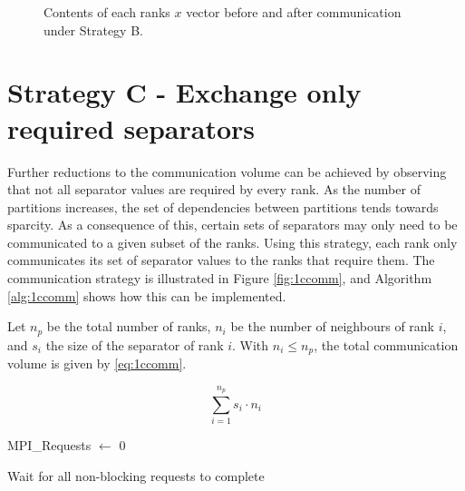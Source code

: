 \begin{figure}[H]
    \centering
    \caption{Contents of each ranks \(x\) vector before and after communication under Strategy B.}
    \label{fig:1bcomm}
\end{figure}

\section{Strategy C - Exchange only required separators}
Further reductions to the communication volume can be achieved by observing that not all separator values are required by every rank. As the number of partitions increases, the set of dependencies between partitions tends towards sparcity. As a consequence of this, certain sets of separators may only need to be communicated to a given subset of the ranks. Using this strategy, each rank only communicates its set of separator values to the ranks that require them. The communication strategy is illustrated in Figure \ref{fig:1ccomm}, and Algorithm \ref{alg:1ccomm} shows how this can be implemented.
\medskip

Let \(n_{p}\) be the total number of ranks, \(n_{i}\) be the number of neighbours of rank \(i\), and \(s_{i}\) the size of the separator of rank \(i\). With \(n_{i} \leq n_{p}\), the total communication volume is given by \ref{eq:1ccomm}.

\begin{equation}
    \label{eq:1ccomm}
    \sum_{i=1}^{n_{p}} s_i \cdot  n_{i} 
\end{equation}

\begin{algorithm}[H]
    \label{alg:1ccomm}
    \caption{Exchange only required separators}
    \SetAlgoVlined
    \Output{\newline}

    MPI\_Requests \(\gets\) 0\\
 

    Wait for all non-blocking requests to complete\\
\end{algorithm}


